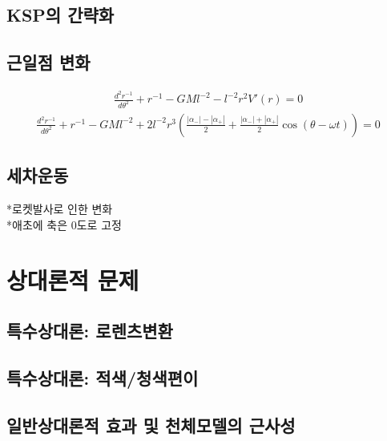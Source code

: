 \documentclass[9pt]{amsbook}
\begin{document}
\section{KSP의 간략화}
\section{근일점 변화}
\begin{align}
	\frac{d^2r^{-1}}{d\theta^2}+r^{-1}-GMl^{-2}-l^{-2}r^2V'(r) = 0
\end{align}
\begin{align}
	\frac{d^2r^{-1}}{d\theta^2}+r^{-1}-GMl^{-2}+2 l^{-2}r^3 \left(\frac{|\alpha_-| -|\alpha_+|}{2}+\frac{|\alpha_-| +|\alpha_+|}{2}\cos(\theta-\omega t)\right)= 0
\end{align}


\section{세차운동}
*로켓발사로 인한 변화
\\*애초에 축은 0도로 고정
\chapter{상대론적 문제}
\section{특수상대론: 로렌츠변환}
\section{특수상대론: 적색/청색편이}
\section{일반상대론적 효과 및 천체모델의 근사성}



\backmatter
\backpage
\end{document}
